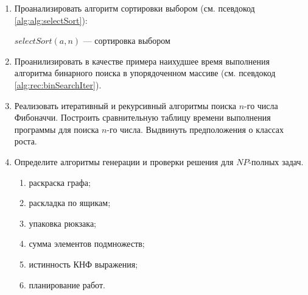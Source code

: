 \begin{enumerate}
\begin{algorithm}
\begin{algorithmic}[1]
                    \ENDIF
                \ENDFOR
            \ENDFOR
        \end{algorithmic}
    \end{algorithm}
    
    \item Проанализировать алгоритм сортировки выбором (см. псевдокод \ref{alg:alg:selectSort}):
    \begin{algorithm}
        \caption{$selectSort(a,n)$ --- сортировка выбором}
        \label{alg:alg:selectSort}
        \begin{algorithmic}[1]
            
                    \ENDIF
                \ENDFOR
            \ENDFOR
        \end{algorithmic}
    \end{algorithm}
    
    \item Проанилизировать в качестве примера наихудшее время выполнения алгоритма бинарного поиска в упорядоченном массиве (см. псевдокод \ref{alg:rec:binSearchIter}).
    
    \item Реализовать итеративный и рекурсивный алгоритмы поиска $n$-го числа Фибоначчи. Построить сравнительную таблицу времени выполнения программы для поиска $n$-го числа. Выдвинуть предположения о классах роста.
    
    \item Определите алгоритмы генерации и проверки решения для $NP$-полных задач.
    \begin{enumerate}
        \item раскраска графа;
        \item раскладка по ящикам;
        \item упаковка рюкзака;
        \item сумма элементов подмножеств;
        \item истинность КНФ выражения;
        \item планирование работ.
    \end{enumerate}
    

\end{enumerate}
